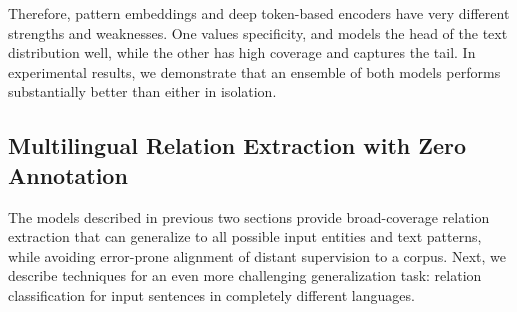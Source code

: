 Therefore, pattern embeddings and deep token-based encoders have very different strengths and weaknesses. One values specificity, and models the head of the text distribution well, while the other has high coverage and captures the tail. In experimental results, we demonstrate that an ensemble of both models performs substantially better than either in isolation.



\subsection{Multilingual Relation Extraction with Zero Annotation \label{sec:multilingual}}

The models described in previous two sections provide broad-coverage relation extraction that can generalize to all possible input entities and text patterns, while avoiding error-prone alignment of distant supervision to a corpus. Next, we describe techniques for an even more challenging generalization task: relation classification for input sentences in completely different languages.


